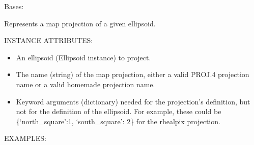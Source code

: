 \documentclass[a4paper,12ptopenany,oneside,english]{sphinxmanual}
\begin{document}
\begin{fulllineitems}
\label{\detokenize{projection_wrapper:rhealpixdggs.projection_wrapper.Proj}}
\pysigstartsignatures
{}
\pysigstopsignatures
\sphinxAtStartPar
Bases: 

\sphinxAtStartPar
Represents a map projection of a given ellipsoid.

\sphinxAtStartPar
INSTANCE ATTRIBUTES:
\begin{itemize}
\item {} 
\sphinxAtStartPar
{} \sphinxhyphen{} An ellipsoid (Ellipsoid instance) to project.

\item {} 
\sphinxAtStartPar
{} \sphinxhyphen{} The name (string) of the map projection, either a valid PROJ.4
projection name or a valid homemade projection name.

\item {} 
\sphinxAtStartPar
{} \sphinxhyphen{} Keyword arguments (dictionary) needed for the projection’s
definition, but not for the definition of the ellipsoid.  For example,
these could be \{‘north\_square’:1, ‘south\_square’: 2\} for the rhealpix
projection.

\end{itemize}

\sphinxAtStartPar
EXAMPLES:


\end{fulllineitems}
\end{document}
